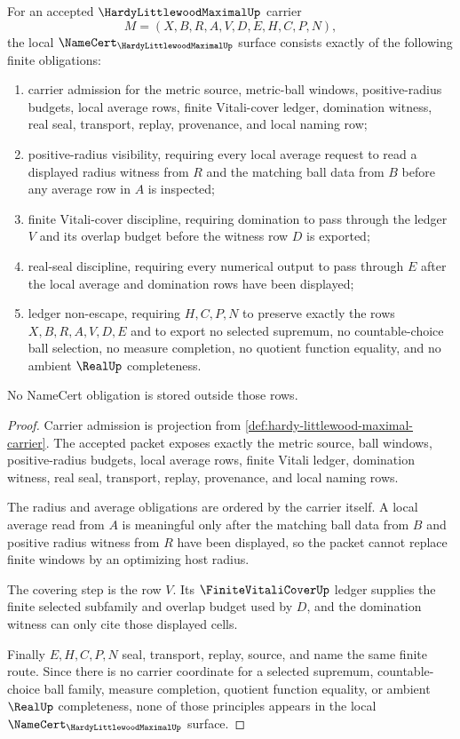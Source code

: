 \begin{theorem}
\label{thm:hardy-littlewood-maximal-namecert-obligations}
For an accepted $\HardyLittlewoodMaximalUp$ carrier
$$
M=(X,B,R,A,V,D,E,H,C,P,N),
$$
the local $\NameCert_{\HardyLittlewoodMaximalUp}$ surface consists exactly of the following finite obligations:
\begin{enumerate}
\item carrier admission for the metric source, metric-ball windows, positive-radius budgets, local average rows, finite Vitali-cover ledger, domination witness, real seal, transport, replay, provenance, and local naming row;
\item positive-radius visibility, requiring every local average request to read a displayed radius witness from $R$ and the matching ball data from $B$ before any average row in $A$ is inspected;
\item finite Vitali-cover discipline, requiring domination to pass through the ledger $V$ and its overlap budget before the witness row $D$ is exported;
\item real-seal discipline, requiring every numerical output to pass through $E$ after the local average and domination rows have been displayed;
\item ledger non-escape, requiring $H,C,P,N$ to preserve exactly the rows $X,B,R,A,V,D,E$ and to export no selected supremum, no countable-choice ball selection, no measure completion, no quotient function equality, and no ambient $\RealUp$ completeness.
\end{enumerate}
No NameCert obligation is stored outside those rows.
\end{theorem}
\begin{proof}
Carrier admission is projection from \autoref{def:hardy-littlewood-maximal-carrier}. The accepted packet exposes exactly the metric source, ball windows, positive-radius budgets, local average rows, finite Vitali ledger, domination witness, real seal, transport, replay, provenance, and local naming rows.

The radius and average obligations are ordered by the carrier itself. A local average read from $A$ is meaningful only after the matching ball data from $B$ and positive radius witness from $R$ have been displayed, so the packet cannot replace finite windows by an optimizing host radius.

The covering step is the row $V$. Its $\FiniteVitaliCoverUp$ ledger supplies the finite selected subfamily and overlap budget used by $D$, and the domination witness can only cite those displayed cells.

Finally $E,H,C,P,N$ seal, transport, replay, source, and name the same finite route. Since there is no carrier coordinate for a selected supremum, countable-choice ball family, measure completion, quotient function equality, or ambient $\RealUp$ completeness, none of those principles appears in the local $\NameCert_{\HardyLittlewoodMaximalUp}$ surface.
\end{proof}

